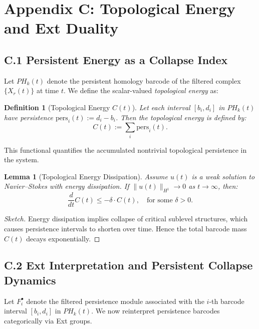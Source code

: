 \documentclass[11pt]{article}
\newtheorem{definition}[theorem]{Definition}
\newtheorem{lemma}[theorem]{Lemma}
\begin{document}

\section*{Appendix C: Topological Energy and Ext Duality}

\subsection*{C.1 Persistent Energy as a Collapse Index}

Let $PH_k(t)$ denote the persistent homology barcode of the filtered complex $\{X_r(t)\}$ at time $t$.  
We define the scalar-valued \emph{topological energy} as:

\begin{definition}[Topological Energy $C(t)$]
Let each interval $[b_i, d_i]$ in $PH_k(t)$ have persistence $\text{pers}_i(t) := d_i - b_i$.  
Then the topological energy is defined by:
\[
C(t) := \sum_i \text{pers}_i(t).
\]
\end{definition}

This functional quantifies the accumulated nontrivial topological persistence in the system.

\begin{lemma}[Topological Energy Dissipation]
Assume $u(t)$ is a weak solution to Navier--Stokes with energy dissipation.  
If $\|u(t)\|_{H^1} \to 0$ as $t \to \infty$, then:
\[
\frac{d}{dt} C(t) \leq -\delta \cdot C(t), \quad \text{for some } \delta > 0.
\]
\end{lemma}

\begin{proof}[Sketch]
Energy dissipation implies collapse of critical sublevel structures, which causes persistence intervals to shorten over time.  
Hence the total barcode mass $C(t)$ decays exponentially.
\end{proof}

\subsection*{C.2 Ext Interpretation and Persistent Collapse Dynamics}

Let \( F^\bullet_i \) denote the filtered persistence module associated with the \( i \)-th barcode interval \( [b_i, d_i] \) in \( PH_k(t) \).  
We now reinterpret persistence barcodes categorically via Ext groups.
\end{document}
